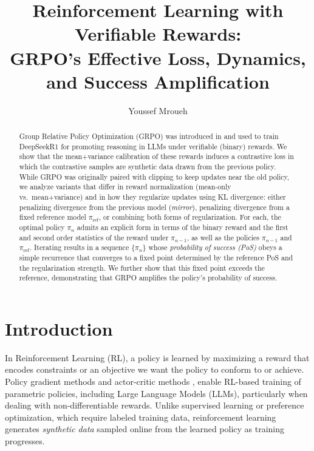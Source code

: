 \documentclass[11pt,reqno]{amsart}
\title[Reinforcement Learning with Verifiable Rewards]{Reinforcement Learning with Verifiable Rewards:\\ GRPO's Effective Loss, Dynamics, and Success Amplification}
\author[Y. Mroueh]{Youssef Mroueh}
\newcommand{\youssef}[1]{\textbf{\textcolor{blue}{Youssef: #1}}}
\begin{document}
\maketitle





\begin{abstract}
Group Relative Policy Optimization (GRPO) was introduced in \citep{shao2024deepseekmath} and used to train DeepSeek\textendash R1 \citep{guo2025deepseekR1} for promoting reasoning in LLMs under verifiable (binary) rewards. We show that the mean{+}variance calibration of these rewards induces a contrastive loss in which the contrastive samples are synthetic data drawn from the previous policy. While GRPO was originally paired with clipping to keep updates near the old policy, we analyze variants that differ in reward normalization (mean-only vs.\ mean{+}variance) and in how they regularize updates using KL divergence: either penalizing divergence from the previous model (\emph{mirror}), penalizing divergence from a fixed reference model $\pi_{\mathrm{ref}}$, or combining both forms of regularization. For each, the optimal policy $\pi_n$ admits an explicit form in terms of the binary reward and the first and second  order statistics of the reward under $\pi_{n-1}$, as well as the policies $\pi_{n-1}$ and $\pi_{\mathrm{ref}}$. Iterating results in a sequence  $\{\pi_n\}$ whose \emph{probability of success (PoS)} obeys a simple recurrence that converges to a fixed point determined by the reference PoS and the regularization strength. We further show that this fixed point exceeds the reference, demonstrating that GRPO amplifies the policy's probability of success.
\end{abstract}





\section{Introduction}

In Reinforcement Learning (RL), a policy is learned by maximizing a reward that encodes constraints or an objective we want the policy to conform to or achieve. Policy gradient methods and actor-critic methods \citep{sutton1998reinforcement}, enable RL-based training of parametric policies, including Large Language Models (LLMs), particularly when dealing with non-differentiable rewards. Unlike supervised learning or preference optimization, which require labeled training data, reinforcement learning generates \emph{synthetic data} sampled online from the learned policy as training progresses.
\end{document}
